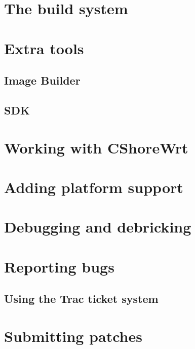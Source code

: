 \documentclass[a4paper]{book}
\begin{document}
  \section{The build system}
    
  \section{Extra tools}
    \subsection{Image Builder}
    \subsection{SDK}
  \section{Working with CShoreWrt}
    
  \section{Adding platform support}
     
  \section{Debugging and debricking}
     
   \section{Reporting bugs}
	\subsection{Using the Trac ticket system}
	
   \section{Submitting patches}
    
\end{document}
